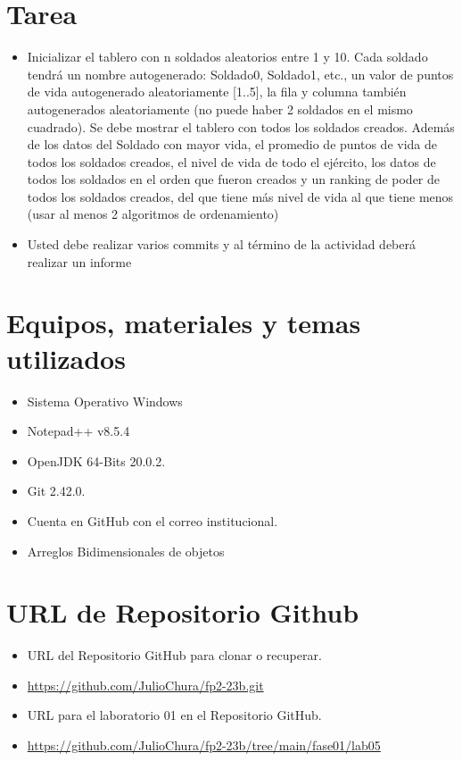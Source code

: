 \documentclass{article}
\begin{document}
	\section{Tarea}
	\begin{itemize}		
		\item 
		Inicializar el tablero con n soldados aleatorios entre 1 y 10. Cada soldado tendrá un nombre 
		autogenerado: Soldado0, Soldado1, etc., un valor de puntos de vida autogenerado 
		aleatoriamente [1..5], la fila y columna también autogenerados aleatoriamente (no puede 
		haber 2 soldados en el mismo cuadrado). Se debe mostrar el tablero con todos los soldados creados. Además de los datos del Soldado con mayor vida, 
		el promedio de puntos de vida de todos los soldados creados, el nivel de vida de todo el ejército, los datos de todos los soldados en el orden que fueron creados y un ranking de poder de todos los soldados creados, del que tiene más nivel de vida al que tiene menos (usar al 
		menos 2 algoritmos de ordenamiento)
		
		\item Usted debe realizar varios commits y al término de la actividad deberá realizar un informe
		
	\end{itemize}
	
	\section{Equipos, materiales y temas utilizados}
	\begin{itemize}
		\item Sistema Operativo Windows
		\item Notepad++ v8.5.4
		\item OpenJDK 64-Bits 20.0.2.
		\item Git 2.42.0.
		\item Cuenta en GitHub con el correo institucional.
		\item Arreglos Bidimensionales de objetos
	\end{itemize}
	
	\section{URL de Repositorio Github}
	\begin{itemize}
		\item URL del Repositorio GitHub para clonar o recuperar.
		\item \url{https://github.com/JulioChura/fp2-23b.git}
		\item URL para el laboratorio 01 en el Repositorio GitHub.
		\item \url{https://github.com/JulioChura/fp2-23b/tree/main/fase01/lab05}
	\end{itemize}
	
\end{document}
